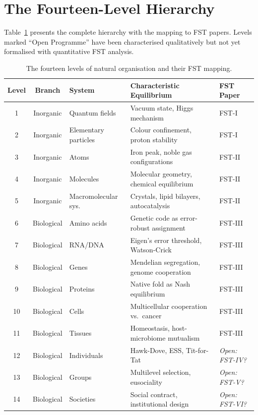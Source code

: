 \documentclass[12pt,a4paper]{article}
\theoremstyle{remark}
\begin{document}
\section{The Fourteen-Level Hierarchy}
\label{sec:hierarchy}

Table~\ref{tab:hierarchy} presents the complete hierarchy with the mapping to FST papers. Levels marked ``Open Programme'' have been characterised qualitatively but not yet formalised with quantitative FST analysis.

\begin{table}[htbp]
  \centering
  \caption{The fourteen levels of natural organisation and their FST mapping.}
  \label{tab:hierarchy}
  \small
  \begin{tabularx}{\textwidth}{c c l X l}
    \toprule
    \textbf{Level} & \textbf{Branch} & \textbf{System} & \textbf{Characteristic Equilibrium} & \textbf{FST Paper} \\
    \midrule
    1  & Inorganic  & Quantum fields       & Vacuum state, Higgs mechanism           & FST-I \\
    2  & Inorganic  & Elementary particles  & Colour confinement, proton stability    & FST-I \\
    3  & Inorganic  & Atoms                & Iron peak, noble gas configurations     & FST-II \\
    4  & Inorganic  & Molecules            & Molecular geometry, chemical equilibrium & FST-II \\
    5  & Inorganic  & Macromolecular sys.  & Crystals, lipid bilayers, autocatalysis & FST-II \\
    \midrule
    6  & Biological & Amino acids          & Genetic code as error-robust assignment & FST-III \\
    7  & Biological & RNA/DNA              & Eigen's error threshold, Watson-Crick   & FST-III \\
    8  & Biological & Genes                & Mendelian segregation, genome cooperation & FST-III \\
    9  & Biological & Proteins             & Native fold as Nash equilibrium         & FST-III \\
    10 & Biological & Cells                & Multicellular cooperation vs.\ cancer   & FST-III \\
    11 & Biological & Tissues              & Homeostasis, host-microbiome mutualism  & FST-III \\
    \midrule
    12 & Biological & Individuals          & Hawk-Dove, ESS, Tit-for-Tat            & \textit{Open: FST-IV?} \\
    13 & Biological & Groups               & Multilevel selection, eusociality       & \textit{Open: FST-V?} \\
    14 & Biological & Societies            & Social contract, institutional design   & \textit{Open: FST-VI?} \\
    \bottomrule
  \end{tabularx}
\end{table}
\end{document}
